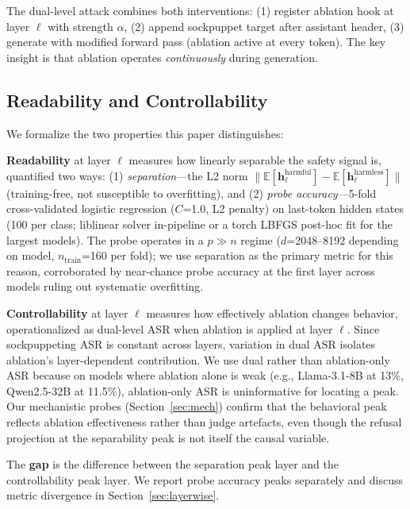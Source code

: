 \documentclass{article}
\begin{document}
The dual-level attack combines both interventions: (1) register ablation hook at layer $\ell$ with strength $\alpha$, (2) append sockpuppet target after assistant header, (3) generate with modified forward pass (ablation active at every token). The key insight is that ablation operates \textit{continuously} during generation.

\subsection{Readability and Controllability}
\label{sec:definitions}

We formalize the two properties this paper distinguishes:

\textbf{Readability} at layer $\ell$ measures how linearly separable the safety signal is, quantified two ways: (1) \textit{separation}---the L2 norm $\|\mathbb{E}[\mathbf{h}_\ell^{\text{harmful}}] - \mathbb{E}[\mathbf{h}_\ell^{\text{harmless}}]\|$ (training-free, not susceptible to overfitting), and (2) \textit{probe accuracy}---5-fold cross-validated logistic regression ($C$=1.0, L2 penalty) on last-token hidden states (100 per class; liblinear solver in-pipeline or a torch LBFGS post-hoc fit for the largest models). The probe operates in a $p \gg n$ regime ($d$=2048--8192 depending on model, $n_\text{train}$=160 per fold); we use separation as the primary metric for this reason, corroborated by near-chance probe accuracy at the first layer across models ruling out systematic overfitting.

\textbf{Controllability} at layer $\ell$ measures how effectively ablation changes behavior, operationalized as dual-level ASR when ablation is applied at layer $\ell$. Since sockpuppeting ASR is constant across layers, variation in dual ASR isolates ablation's layer-dependent contribution. We use dual rather than ablation-only ASR because on models where ablation alone is weak (e.g., Llama-3.1-8B at 13\%, Qwen2.5-32B at 11.5\%), ablation-only ASR is uninformative for locating a peak. Our mechanistic probes (Section~\ref{sec:mech}) confirm that the behavioral peak reflects ablation effectiveness rather than judge artefacts, even though the refusal projection at the separability peak is not itself the causal variable.

The \textbf{gap} is the difference between the separation peak layer and the controllability peak layer. We report probe accuracy peaks separately and discuss metric divergence in Section~\ref{sec:layerwise}.
\end{document}

